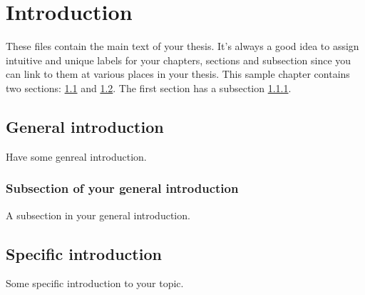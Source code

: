 
\chapter{Introduction}
\label{chap_intro}

These files contain the main text of your thesis. It's always a good idea to assign
intuitive and unique labels for your chapters, sections and subsection since you
can link to them at various places in your thesis. This sample chapter contains
two sections: \ref{gen_intro} and \ref{specific_intro}. The first section has a
subsection \ref{subsec_for_gen_intro}.

\section{General introduction}
\label{gen_intro}

Have some genreal introduction.

\subsection{Subsection of your general introduction}
\label{subsec_for_gen_intro}

A subsection in your general introduction.

\section{Specific introduction}
\label{specific_intro}

Some specific introduction to your topic.
